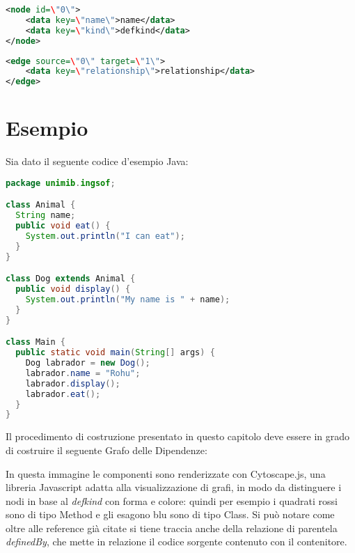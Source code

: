 \begin{lstlisting}[language=XML, caption=esempio di nodo]
<node id=\"0\">
    <data key=\"name\">name</data>
    <data key=\"kind\">defkind</data>
</node>
\end{lstlisting}

\begin{lstlisting}[language=XML, caption=esempio di arco]
<edge source=\"0\" target=\"1\">
    <data key=\"relationship\">relationship</data>
</edge>
\end{lstlisting}

\section{Esempio}

Sia dato il seguente codice d'esempio Java:

\begin{lstlisting}[language=Java]
package unimib.ingsof;

class Animal {
  String name;
  public void eat() {
    System.out.println("I can eat");
  }
}

class Dog extends Animal {
  public void display() {
    System.out.println("My name is " + name);
  }
}

class Main {
  public static void main(String[] args) {
    Dog labrador = new Dog();
    labrador.name = "Rohu";
    labrador.display();
    labrador.eat();
  }
}
\end{lstlisting}

Il procedimento di costruzione presentato in questo capitolo deve essere in grado di costruire il seguente Grafo delle Dipendenze:


In questa immagine le componenti sono renderizzate con Cytoscape.js, una libreria Javascript adatta alla visualizzazione di grafi, in modo da distinguere i nodi in base al \emph{defkind} con forma e colore: quindi per esempio i quadrati rossi sono di tipo Method e gli esagono blu sono di tipo Class.
Si pu\`o notare come oltre alle reference gi\`a citate si tiene traccia anche della relazione di parentela \emph{definedBy}, che mette in relazione il codice sorgente contenuto con il contenitore.
